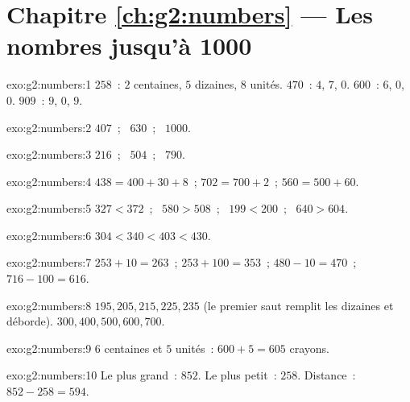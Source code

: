 \section*{Chapitre \ref{ch:g2:numbers} --- Les nombres jusqu'à 1000}

\begin{solution}{exo:g2:numbers:1}
$258$~: $2$ centaines, $5$ dizaines, $8$ unités. $470$~: $4$, $7$,
$0$. $600$~: $6$, $0$, $0$. $909$~: $9$, $0$, $9$.
\end{solution}

\begin{solution}{exo:g2:numbers:2}
$407$~; \ $630$~; \ $1000$.
\end{solution}

\begin{solution}{exo:g2:numbers:3}
$216$~; \ $504$~; \ $790$.
\end{solution}

\begin{solution}{exo:g2:numbers:4}
$438 = 400 + 30 + 8$~; \quad $702 = 700 + 2$~; \quad
$560 = 500 + 60$.
\end{solution}

\begin{solution}{exo:g2:numbers:5}
$327 < 372$~; \ $580 > 508$~; \ $199 < 200$~; \ $640 > 604$.
\end{solution}

\begin{solution}{exo:g2:numbers:6}
$304 < 340 < 403 < 430$.
\end{solution}

\begin{solution}{exo:g2:numbers:7}
$253 + 10 = 263$~; \quad $253 + 100 = 353$~; \quad
$480 - 10 = 470$~; \quad $716 - 100 = 616$.
\end{solution}

\begin{solution}{exo:g2:numbers:8}
$195, 205, 215, 225, 235$ (le premier saut remplit les dizaines et
déborde). $300, 400, 500, 600, 700$.
\end{solution}

\begin{solution}{exo:g2:numbers:9}
$6$ centaines et $5$ unités~: $600 + 5 = 605$ crayons.
\end{solution}

\begin{solution}{exo:g2:numbers:10}
Le plus grand~: $852$. Le plus petit~: $258$. Distance~:
$852 - 258 = 594$.
\end{solution}
